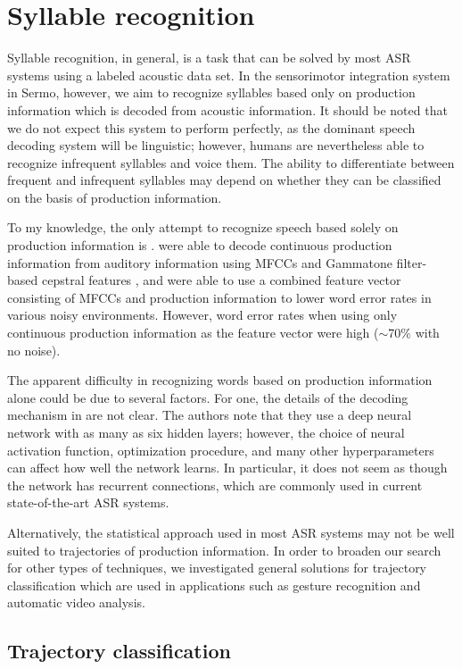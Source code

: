 \section{Syllable recognition}

Syllable recognition, in general,
is a task that can be solved
by most ASR systems
using a labeled acoustic data set.
In the sensorimotor integration system
in Sermo, however,
we aim to recognize syllables
based only on production information
which is decoded from acoustic information.
It should be noted that we do not expect
this system to perform perfectly,
as the dominant speech decoding system
will be linguistic;
however, humans are nevertheless able
to recognize infrequent syllables
and voice them.
The ability to differentiate
between frequent and infrequent syllables
may depend on whether they
can be classified
on the basis of production information.

To my knowledge,
the only attempt to recognize speech
based solely on production information
is \citet{mitra2014}.
\citeauthor{mitra2014} were able to
decode continuous production information
from auditory information
using MFCCs and Gammatone filter-based
cepstral features \citep{mitra2012},
and were able to use a combined feature vector
consisting of MFCCs and production information
to lower word error rates
in various noisy environments.
However, word error rates
when using only continuous production information
as the feature vector
were high ($\sim$70\% with no noise).

The apparent difficulty
in recognizing words based on
production information alone
could be due to several factors.
For one, the details of the decoding mechanism
in \citet{mitra2014} are not clear.
The authors note that they use a
deep neural network
with as many as six hidden layers;
however, the choice of neural activation function,
optimization procedure,
and many other hyperparameters
can affect how well the network learns.
In particular, it does not seem as though
the network has recurrent connections,
which are commonly used in
current state-of-the-art ASR systems.

Alternatively, the statistical approach
used in most ASR systems
may not be well suited to
trajectories of production information.
In order to broaden our search
for other types of techniques,
we investigated general solutions
for trajectory classification
which are used in applications
such as gesture recognition
and automatic video analysis.

\subsection{Trajectory classification}
\label{sec:prev-classification}

